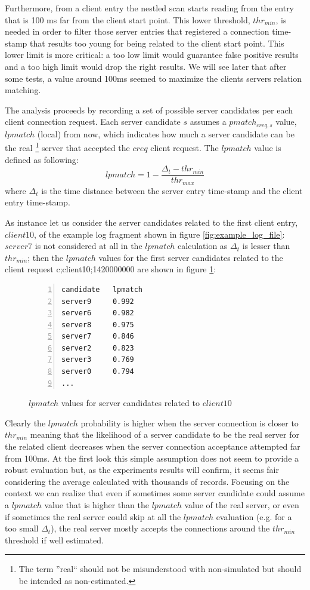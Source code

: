 Furthermore, from a client
entry the nestled scan starts reading from the entry that is 100 ms far
from the client start point. This lower threshold, $thr_{min}$, is needed in order to
 filter those server entries that registered a connection time-stamp
that results too young for being related to the client start point. This
lower limit is more critical: a too low limit would guarantee false
positive results and a too high limit would drop the right results.
We will see later that after some tests, a value around 100ms seemed to maximize 
the clients servers relation matching. %

The analysis proceeds by recording a set of possible server candidates 
 per each client connection request. Each server candidate $s$ assumes a
$pmatch_{creq,s}$ value, $lpmatch$ (local) from now, which
indicates how much a server candidate can be the real
\footnote{The term ''real`` should not be misunderstood with
non-simulated but should be intended as non-estimated.}
 server that
accepted the $creq$
client request. The $lpmatch$ value is defined
as following:
\begin{equation}
lpmatch = 1 - \frac{\Delta_t - thr_{min}}{thr_{max}}
\end{equation}
where $\Delta_t$ is the time distance between the server entry time-stamp and
the client entry time-stamp.

As instance let us consider the server candidates related to the first
client entry, $client10$, of the example log
fragment shown in figure \ref{fig:example_log_file}: 
$server7$ is not considered at all in the $lpmatch$ calculation  as $\Delta_t$ 
is lesser than $thr_{min}$; then the $lpmatch$ values for the first server
candidates related to the client request c;client10;1420000000 are shown in figure \ref{fig:lpmatch}:
\begin{figure}[h]
\begin{lstlisting}[language=bash,frame=single, numbers=left]
candidate 	lpmatch
server9 	0.992
server6 	0.982
server8 	0.975
server7  	0.846
server2  	0.823 
server3  	0.769
server0  	0.794
...
\end{lstlisting}
\caption{$lpmatch$ values for server candidates related to $client10$}
\label{fig:lpmatch}
\end{figure}

Clearly the $lpmatch$ probability is higher when the server connection is
closer to $thr_{min}$ meaning that the likelihood of a server
candidate to be the real server for the related client decreases when
the server connection acceptance attempted far from 100ms. At the
first look this simple
assumption does not seem to provide a robust evaluation but, as the
experiments results will confirm, it seems fair considering the average
calculated with thousands of records. Focusing on the context we can realize that 
even if sometimes some server candidate could assume a $lpmatch$ value
that is higher than the $lpmatch$ value of the real server, or even if sometimes the
real server could skip at all the $lpmatch$ evaluation (e.g.
for a too small $\Delta_t$), the real server mostly accepts
the connections around the $thr_{min}$ threshold if well
estimated.

